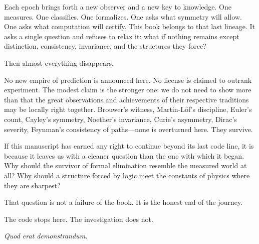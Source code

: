 \documentclass[11pt,a4paper]{book}
\begin{document}
Each epoch brings forth a new observer and a new key to knowledge. One
measures. One classifies. One formalizes. One asks what symmetry will
allow. One asks what computation will certify. This book belongs to
that last lineage. It asks a single question and refuses to relax it:
what if nothing remains except distinction, consistency, invariance,
and the structures they force?

Then almost everything disappears.

No new empire of prediction is announced here. No license is claimed
to outrank experiment. The modest claim is the stronger one: we do not
need to show more than that the great observations and achievements of
their respective traditions may be locally right together. Brouwer's
witness, Martin-Löf's discipline, Euler's count, Cayley's symmetry,
Noether's invariance, Curie's asymmetry, Dirac's severity, Feynman's
consistency of paths---none is overturned here. They survive.

If this manuscript has earned any right to continue beyond its last
code line, it is because it leaves us with a cleaner question than the
one with which it began. Why should the survivor of formal elimination
resemble the measured world at all? Why should a structure forced by
logic meet the constants of physics where they are sharpest?

That question is not a failure of the book. It is the honest end of
the journey.

The code stops here. The investigation does not.

\textit{Quod erat demonstrandum.}
\end{document}
